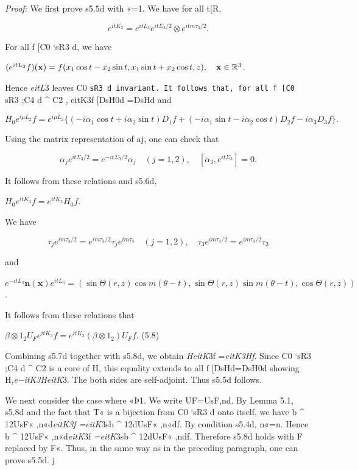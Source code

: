 \documentclass{article}
\begin{document}
\textit{Proof:} We first prove s5.5d with «=1. We have for all t[R,

$$e^{i t K_{3}}=e^{i t L_{3}}e^{i t\Sigma_{3}/2}\otimes e^{i t m\tau_{3}/2}.$$

For all f [C0 `sR3 d, we have

$(e^{itL_{3}}f)({\bf x})=f(x_{1}\cos t-x_{2}\sin t,x_{1}\sin t+x_{2}\cos t,z),\quad{\bf x}\in\mathbb{R}^{3}$.

Hence \textit{eitL}3 leaves C0 \verb|sR3 d invariant. It follows that, for all f [C0 |sR3 ;C4 d ^ C2 , eitK3f [DsH0d =DsHd and

$$H_{0}e^{i\mu L_{2}}f=e^{i\mu L_{2}}\{(-i\alpha_{1}\cos t+i\alpha_{2}\sin t)D_{1}f+(-i\alpha_{1}\sin t-i\alpha_{2}\cos t)D_{2}f-i\alpha_{3}D_{3}f\}.\tag{5.6}$$

Using the matrix representation of aj, one can check that

$$\alpha_{j}e^{i t\Sigma_{3}/2}=e^{-i t\Sigma_{3}/2}\alpha_{j}\quad(j=1,2),\quad[\alpha_{3},e^{i t\Sigma_{3}}]=0.$$

It follows from these relations and s5.6d,

$H_{0}e^{itK_{3}}f=e^{itK_{3}}H_{0}f$.

We have

$$\tau_{j}e^{i m\tau_{3}/2}=e^{i m\tau_{3}/2}\tau_{j}e^{i m\tau_{3}}\quad(j=1,2),\quad\tau_{3}e^{i m\tau_{3}/2}=e^{i m\tau_{3}/2}\tau_{3}$$

and

$e^{-itL_{3}}\mathbf{n}(\mathbf{x})e^{itL_{3}}=(\sin\Theta(r,z)\cos m(\theta-t),\sin\Theta(r,z)\sin m(\theta-t),\cos\Theta(r,z))$.

It follows from these relations that

$\beta\otimes1_{2}U_{F}e^{itK_{3}}f=e^{itK_{3}}(\beta\otimes1_{2})U_{F}f$. (5.8)

Combining s5.7d together with s5.8d, we obtain \textit{HeitK}3f =\textit{eitK3Hf}. Since C0 `sR3 ;C4 d ^ C2 is a core of H, this equality extends to all f [DsHd=DsH0d showing H,\textit{e−itK3HeitK}3. The both sides are self-adjoint. Thus s5.5d follows.

We next consider the case where «Þ1. We write UF=UsF,nd. By Lemma 5.1, s5.8d and the fact that T« is a bijection from C0 `sR3 d onto itself, we have b ^ 12UsF« ,n«d\textit{eitK3f =eitK}3sb ^ 12dUsF« ,n«df. By condition s5.4d, n«=n. Hence b ^ 12UsF« ,n«d\textit{eitK}3f \textit{=eitK}3sb ^ 12dUsF« ,ndf. Therefore s5.8d holds with F replaced by F«. Thus, in the same way as in the preceding paragraph, one can prove s5.5d. j
\end{document}

